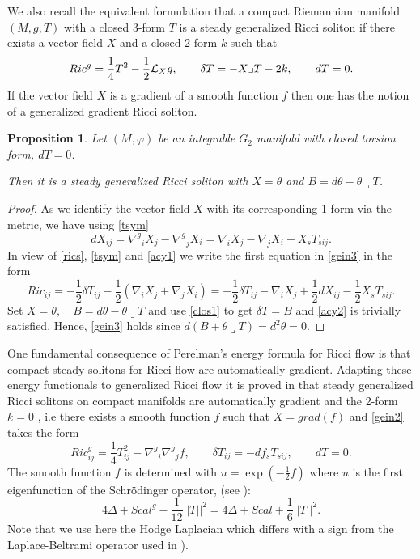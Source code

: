 \documentclass[10pt,british]{article}
\newtheorem{prop}[thrm]{Proposition}
\def\d{\delta}
\def\sb {{\nabla}}
\def\LC{{\nabla^g}}
\def\p{{\varphi}}
\begin{document}
We also  recall  the equivalent formulation \cite[Definition~4.31]{GFS} that a compact Riemannian manifold $(M,g,T)$ with a closed 3-form $T$ is a steady generalized   Ricci soliton  if there exists a vector field $X$ and a closed 2-form $k$ such that
\begin{equation}\label{gein2}
Ric^g=\frac14T^2-\frac12{\cal{L}}_Xg, \qquad \delta T=-X\lrcorner T-2k, \qquad dT=0.
\end{equation}
If the vector field $X$ is a gradient of a smooth function $f$ then one has the notion of a generalized gradient Ricci soliton.
\begin{prop}\label{grsol}
Let $(M,\p)$ be an integrable $G_2$ manifold with closed torsion form, $dT=0$. 

Then it is a steady generalized   Ricci soliton with $X=\theta$ and $B=d\theta-\theta\lrcorner T$.
\end{prop}
\begin{proof}
As we identify the vector field $X$ with its corresponding 1-form via the metric, we have using \eqref{tsym}
\begin{equation}\label{acy1}
dX_{ij}=\LC_iX_j-\LC_jX_i=\sb_iX_j-\sb_jX_i+X_sT_{sij}.
\end{equation}
In view of \eqref{rics}, \eqref{tsym} and \eqref{acy1} we write the first equation in \eqref{gein3} in the form
\begin{equation}\label{acy2}
Ric_{ij}=-\frac12\delta T_{ij}-\frac12(\sb_iX_j+\sb_jX_i)=-\frac12\delta T_{ij}-\sb_iX_j+\frac12dX_{ij}-\frac12X_sT_{sij}.
\end{equation}
Set $X=\theta, \quad B=d\theta-\theta\lrcorner T$  and use \eqref{clos1} to get $\d T=B$ and \eqref{acy2} is trivially satisfied. Hence, \eqref{gein3} holds since $d(B+\theta\lrcorner T)=d^2\theta=0$.
\end{proof}
One fundamental consequence of Perelman's energy formula for Ricci flow is that compact steady solitons for Ricci flow are automatically gradient.  Adapting these energy functionals to generalized Ricci
flow it is proved in  \cite[Chapter~6]{GFS}  that steady generalized Ricci solitons on compact manifolds are automatically gradient and the 2-form $k = 0$  \cite[Corollary~6.11]{GFS}, 
i.e there exists a smooth function $f$ such that $X=grad(f)$ and \eqref{gein2} takes the form
\begin{equation}\label{gein1}
Ric^g_{ij}=\frac14T^2_{ij}-\LC_i\LC_j f, \qquad \delta T_{ij}=-df_sT_{sij}, \qquad dT=0.
\end{equation}
The smooth function $f$ is determined with $u=\exp(-\frac12f)$ where $u$ is  the first eigenfunction of the
Schr\"odinger operator, (see \cite[Lemma~6.3, Corollary~6.10, Corollary~6.11]{GFS}):
\begin{equation}\label{schro}4\Delta +Scal^g-\frac1{12}||T||^2=4\Delta +Scal+\frac16||T||^2.
\end{equation}
Note that we use here the Hodge Laplacian which differs with a sign from the Laplace-Beltrami operator used in  \cite[Lemma~6.3, Corollary~6.10, Corollary~6.11]{GFS}).
\end{document}
